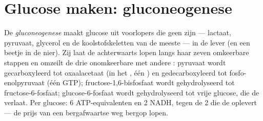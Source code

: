 \section{Glucose maken: gluconeogenese}

\begin{definition}[Gluconeogenese]\label{def:b1:biosyntheses-integration:gluconeogenesis}
De \emph{gluconeogenese} maakt glucose uit voorlopers die geen  zijn ---
lactaat, pyruvaat, glycerol en de koolstofskeletten van de meeste  ---
in de lever (en een beetje in de nier). Zij laat de  achterwaarts lopen
langs haar zeven omkeerbare stappen en omzeilt de drie onomkeerbare met andere
: pyruvaat wordt gecarboxyleerd tot oxaalacetaat (in het , één
) en gedecarboxyleerd tot fosfo-enolpyruvaat (één GTP);
fructose-1,6-bisfosfaat wordt gehydrolyseerd tot fructose-6-fosfaat;
glucose-6-fosfaat wordt gehydrolyseerd tot vrije glucose, die de  verlaat. Per
glucose: 6 ATP-equivalenten en 2 NADH, tegen de 2  die de  oplevert ---
de prijs van een bergafwaartse weg bergop lopen.
\end{definition}

